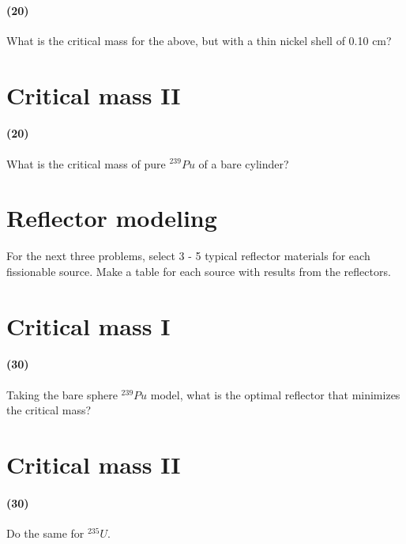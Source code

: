 \documentclass[11pt,a4paper]{article}
\begin{document}
\paragraph*{(20)}
What is the critical mass for the above, but with a thin nickel shell of 0.10 cm?





\newpage

\section{Critical mass II}
\paragraph*{(20)}
What is the critical mass of pure $^{239}Pu$ of a bare cylinder?





\newpage

\section*{Reflector modeling}
For the next three problems, select 3 - 5 typical reflector materials for each fissionable source. Make a table for each source with results from the reflectors.

\newpage

\section{Critical mass I}
\paragraph*{(30)}
Taking the bare sphere $^{239}Pu$ model, what is the optimal reflector that minimizes the critical mass?





\newpage

\section{Critical mass II}
\paragraph*{(30)}
Do the same for $^{235}U$.
\end{document}
